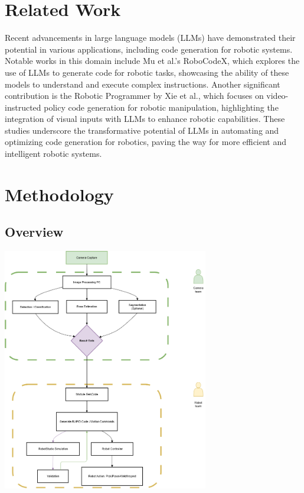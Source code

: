 \documentclass[conference]{IEEEtran}
\begin{document}
\section{Related Work}
Recent advancements in large language models (LLMs) have demonstrated their potential in various applications, including code generation for robotic systems. Notable works in this domain include Mu et al.'s RoboCodeX\cite{mu2024robocodex}, which explores the use of LLMs to generate code for robotic tasks, showcasing the ability of these models to understand and execute complex instructions. Another significant contribution is the Robotic Programmer by Xie et al.\cite{xie2025robotic}, which focuses on video-instructed policy code generation for robotic manipulation, highlighting the integration of visual inputs with LLMs to enhance robotic capabilities. These studies underscore the transformative potential of LLMs in automating and optimizing code generation for robotics, paving the way for more efficient and intelligent robotic systems.

\section{Methodology}
\subsection{Overview}
\includegraphics[width= 9cm]{flow.png}
\end{document}
